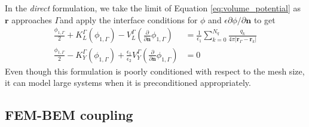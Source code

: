 In the \emph{direct} formulation, we take the limit of Equation \eqref{eq:volume_potential} as $\mathbf{r}$ approaches $\Gamma$and apply the interface conditions for $\phi$ and $\epsilon\partial\phi/\partial\mathbf{n}$ to get
%
\begin{align} \label{eq:direct}
\frac{\phi_{1,\Gamma}}{2}+ K_{L}^{\Gamma}(\phi_{1,\Gamma}) -  V_{L}^{\Gamma} \left(\frac{\partial}{\partial \mathbf{n}}  \phi_{1,\Gamma}  \right) & = \frac{1}{\epsilon_1} \sum_{k=0}^{N_q}  \frac{q_k}{4\pi|\mathbf{r}_{\Gamma} - \mathbf{r}_k|} \nonumber \\
\frac{\phi_{1,\Gamma}}{2} - K_{Y}^{\Gamma}(\phi_{1,\Gamma}) + \frac{\epsilon_1}{\epsilon_2}V_{Y}^{\Gamma} \left( \frac{\partial}{\partial \mathbf{n}} \phi_{1,\Gamma} \right) & = 0
\end{align}
%
Even though this formulation is poorly conditioned with respect to the mesh size, it can model large systems when it is preconditioned appropriately.\cite{AltmanBardhanWhiteTidor09,WangCooperBetckeBarba2021} 

\subsection*{\sffamily \large FEM-BEM coupling}

